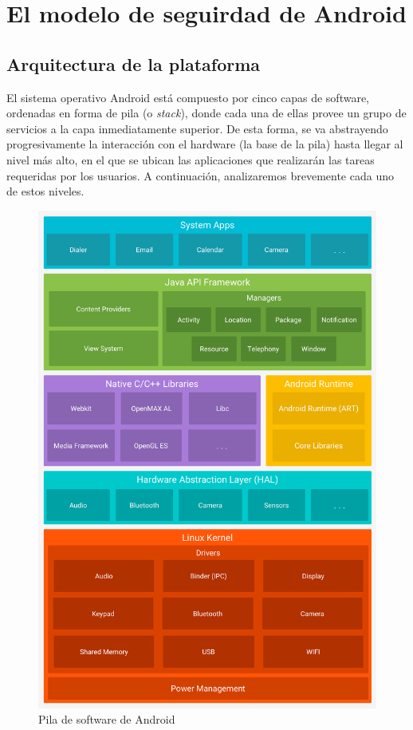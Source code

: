 \chapter{El modelo de seguirdad de Android}
\label{chapter:background}

\section{Arquitectura de la plataforma}
\label{section:architecture}

El sistema operativo Android está compuesto por cinco capas de software, ordenadas en forma de pila
(o \textit{stack}), donde cada una de ellas provee un grupo de servicios a la capa inmediatamente
superior. De esta forma, se va abstrayendo progresivamente la interacción con el hardware (la base
de la pila) hasta llegar al nivel más alto, en el que se ubican las aplicaciones que realizarán las
tareas requeridas por los usuarios. A continuación, analizaremos brevemente cada uno de estos
niveles.

\begin{figure}
    \includegraphics[scale=0.23]{imagenes/android-stack.png}
    \caption{Pila de software de Android}
    \label{fig:android_stack}
\end{figure}


